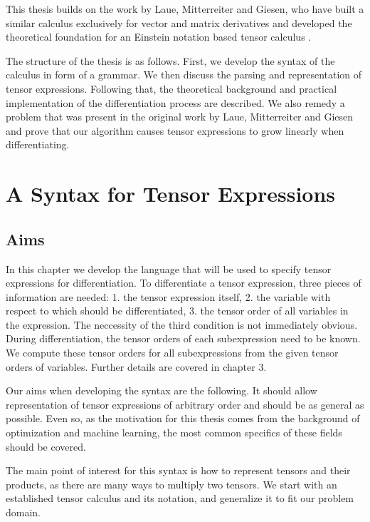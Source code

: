 \documentclass[12pt, a4paper]{report}
\begin{document}
This thesis builds on the work by Laue, Mitterreiter and Giesen, who have built a similar calculus exclusively for vector and matrix derivatives \cite{matrixpaper} and developed the theoretical foundation for an Einstein notation based tensor calculus \cite{tensorpaper}.

The structure of the thesis is as follows.
First, we develop the syntax of the calculus in form of a grammar.
We then discuss the parsing and representation of tensor expressions.
Following that, the theoretical background and practical implementation of the differentiation process are described.
We also remedy a problem that was present in the original work \cite{tensorpaper} by Laue, Mitterreiter and Giesen and prove that our algorithm causes tensor expressions to grow linearly when differentiating.


\chapter{A Syntax for Tensor Expressions}
\section{Aims}
In this chapter we develop the language that will be used to specify tensor expressions for differentiation.
To differentiate a tensor expression, three pieces of information are needed: 1. the tensor expression itself, 2. the variable with respect to which should be differentiated, 3. the tensor order of all variables in the expression.
The neccessity of the third condition is not immediately obvious.
During differentiation, the tensor orders of each subexpression need to be known.
We compute these tensor orders for all subexpressions from the given tensor orders of variables.
Further details are covered in chapter 3.

Our aims when developing the syntax are the following.
It should allow representation of tensor expressions of arbitrary order and should be as general as possible.
Even so, as the motivation for this thesis comes from the background of optimization and machine learning, the most common specifics of these fields should be covered.

The main point of interest for this syntax is how to represent tensors and their products, as there are many ways to multiply two tensors.
We start with an established tensor calculus and its notation, and generalize it to fit our problem domain.
\end{document}
